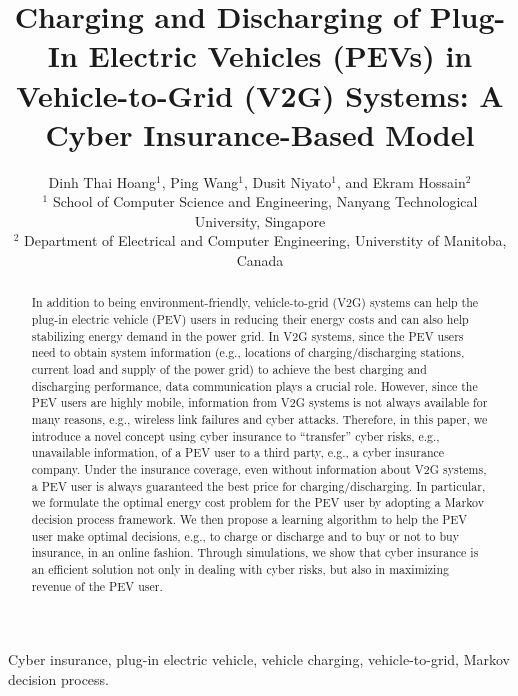 \documentclass[twocolumn,10pt]{IEEEtran}
\begin{document}
\title{Charging and Discharging of Plug-In Electric Vehicles (PEVs) in Vehicle-to-Grid (V2G) Systems: A Cyber Insurance-Based Model}
\author{Dinh Thai Hoang$^1$, Ping Wang$^1$, Dusit Niyato$^1$, and Ekram Hossain$^2$	
\\$^1$ School of Computer Science and Engineering, Nanyang Technological University, Singapore
\\$^2$ Department of Electrical and Computer Engineering, Universtity of Manitoba, Canada \vspace{-5mm}}

\maketitle

\begin{abstract}
In addition to being environment-friendly, vehicle-to-grid (V2G) systems can help the plug-in electric vehicle (PEV) users in reducing their energy costs and can also help stabilizing energy demand in the power grid. In V2G systems, since the PEV users need to obtain system information (e.g., locations of charging/discharging stations, current load and supply of the power grid) to achieve the best  charging and discharging performance, data communication plays a crucial role. However, since the PEV users are highly mobile, information from V2G systems is not always available for many reasons, e.g., wireless link failures and cyber attacks. Therefore, in this paper, we introduce a novel concept using cyber insurance to ``transfer'' cyber risks, e.g., unavailable information, of a PEV user to a third party, e.g., a cyber insurance company. Under the insurance coverage, even without information about V2G systems, a PEV user is always guaranteed the best price for charging/discharging. In particular, we formulate the optimal energy cost problem for the PEV user by adopting a Markov decision process framework. We then propose a learning algorithm to help the PEV user make optimal decisions, e.g., to charge or discharge and to buy or not to buy insurance, in an online fashion. Through simulations, we show that cyber insurance is an efficient solution not only in dealing with cyber risks, but also in maximizing revenue of the PEV user. 
\end{abstract}

\begin{IEEEkeywords}
Cyber insurance,  plug-in electric vehicle, vehicle charging, vehicle-to-grid, Markov decision process. 
\end{IEEEkeywords}
\end{document}

